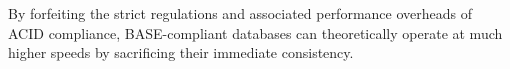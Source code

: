 \noindent By forfeiting the strict regulations and associated performance overheads of ACID compliance, BASE-compliant databases can 
theoretically operate at much higher speeds by sacrificing their immediate consistency.



